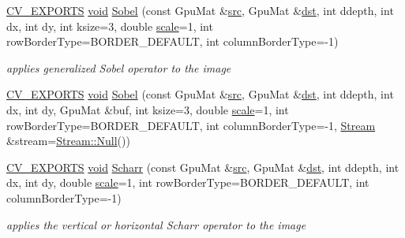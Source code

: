 \begin{DoxyCompactItemize}
\item 
\hyperlink{core_2types__c_8h_a1bf9f0e121b54272da02379cfccd0a2b}{C\-V\-\_\-\-E\-X\-P\-O\-R\-T\-S} \hyperlink{legacy_8hpp_a8bb47f092d473522721002c86c13b94e}{void} \hyperlink{namespacecv_1_1gpu_aaef20414ce6d2e811ef9848e8991eb6c}{Sobel} (const Gpu\-Mat \&\hyperlink{legacy_8hpp_a371cd109b74033bc4366f584edd3dacc}{src}, Gpu\-Mat \&\hyperlink{photo__c_8h_aed13e2a25279b24dc954073233fef7a5}{dst}, int ddepth, int dx, int dy, int ksize=3, double \hyperlink{objdetect_8hpp_a1f622eb9b9e06b30862ca90cdf2c078b}{scale}=1, int row\-Border\-Type=B\-O\-R\-D\-E\-R\-\_\-\-D\-E\-F\-A\-U\-L\-T, int column\-Border\-Type=-\/1)
\begin{DoxyCompactList}\small\item\em applies generalized Sobel operator to the image \end{DoxyCompactList}\item 
\hyperlink{core_2types__c_8h_a1bf9f0e121b54272da02379cfccd0a2b}{C\-V\-\_\-\-E\-X\-P\-O\-R\-T\-S} \hyperlink{legacy_8hpp_a8bb47f092d473522721002c86c13b94e}{void} \hyperlink{namespacecv_1_1gpu_aaf91d355673bc580209397988368c035}{Sobel} (const Gpu\-Mat \&\hyperlink{legacy_8hpp_a371cd109b74033bc4366f584edd3dacc}{src}, Gpu\-Mat \&\hyperlink{photo__c_8h_aed13e2a25279b24dc954073233fef7a5}{dst}, int ddepth, int dx, int dy, Gpu\-Mat \&buf, int ksize=3, double \hyperlink{objdetect_8hpp_a1f622eb9b9e06b30862ca90cdf2c078b}{scale}=1, int row\-Border\-Type=B\-O\-R\-D\-E\-R\-\_\-\-D\-E\-F\-A\-U\-L\-T, int column\-Border\-Type=-\/1, \hyperlink{classcv_1_1gpu_1_1Stream}{Stream} \&stream=\hyperlink{classcv_1_1gpu_1_1Stream_af96c23564834f88333dcb8997df553f1}{Stream\-::\-Null}())
\item 
\hyperlink{core_2types__c_8h_a1bf9f0e121b54272da02379cfccd0a2b}{C\-V\-\_\-\-E\-X\-P\-O\-R\-T\-S} \hyperlink{legacy_8hpp_a8bb47f092d473522721002c86c13b94e}{void} \hyperlink{namespacecv_1_1gpu_acfff38ecb8e7f5bd361fae17a7cc14c5}{Scharr} (const Gpu\-Mat \&\hyperlink{legacy_8hpp_a371cd109b74033bc4366f584edd3dacc}{src}, Gpu\-Mat \&\hyperlink{photo__c_8h_aed13e2a25279b24dc954073233fef7a5}{dst}, int ddepth, int dx, int dy, double \hyperlink{objdetect_8hpp_a1f622eb9b9e06b30862ca90cdf2c078b}{scale}=1, int row\-Border\-Type=B\-O\-R\-D\-E\-R\-\_\-\-D\-E\-F\-A\-U\-L\-T, int column\-Border\-Type=-\/1)
\begin{DoxyCompactList}\small\item\em applies the vertical or horizontal Scharr operator to the image \end{DoxyCompactList}\item 

\end{DoxyCompactItemize}
